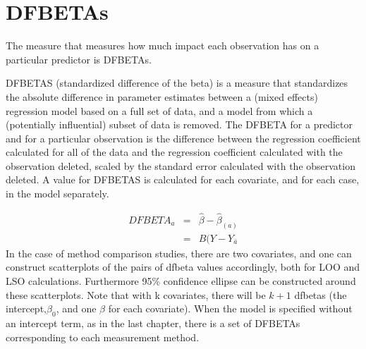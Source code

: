 \documentclass[12pt, a4paper]{report}
\theoremstyle{plain}
\theoremstyle{definition}
\theoremstyle{remark}
\begin{document}
	




\section{DFBETAs}
The measure that measures how much impact each observation has on a particular predictor is DFBETAs. 


DFBETAS (standardized difference of the beta) is a measure that standardizes the absolute difference in parameter estimates between a (mixed effects) regression model based on a full set of data, and a model from which a (potentially influential) subset of data is removed. The DFBETA for a predictor and for a particular observation is the difference between the regression coefficient calculated for all of the data and the regression coefficient calculated with the observation deleted, scaled by the standard error calculated with the observation deleted. 
A value for DFBETAS is calculated for each covariate, and for each case, in the model separately.



\begin{eqnarray}
DFBETA_{a} &=& \hat{\beta} - \hat{\beta}_{(a)} \\
&=& B(Y-Y_{\bar{a}}
\end{eqnarray}
In the case of method comparison studies, there are two covariates, and one can construct scatterplots of the pairs of dfbeta values accordingly, both for LOO and LSO calculations. Furthermore 95\% confidence ellipse can be constructed around these scatterplots.
Note that with k covariates, there will be $k+1$ dfbetas (the intercept,$\beta_0$, and one $\beta$ for each covariate). When the model is specified without an intercept term, as in the last chapter, there is a set of DFBETAs corresponding to each measurement method.




\end{document}

